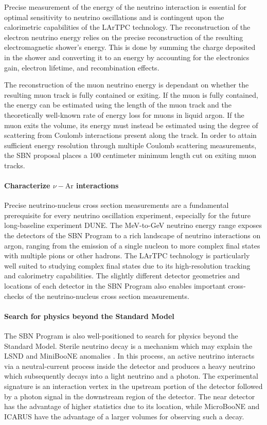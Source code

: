 Precise measurement of the energy of the neutrino interaction is essential for optimal sensitivity to neutrino oscillations and is contingent upon the calorimetric capabilities of the LArTPC technology. The reconstruction of the electron neutrino energy relies on the precise reconstruction of the resulting electromagnetic shower's energy. This is done by summing the charge deposited in the shower and converting it to an energy by accounting for the electronics gain, electron lifetime, and recombination effects. 

The reconstruction of the muon neutrino energy is dependant on whether the resulting muon track is fully contained or exiting. If the muon is fully contained, the energy can be estimated using the length of the muon track and the theoretically well-known rate of energy loss for muons in liquid argon. If the muon exits the volume, its energy must instead be estimated using the degree of scattering from Coulomb interactions present along the track. In order to attain sufficient energy resolution through multiple Coulomb scattering measurements, the SBN proposal places a 100 centimeter minimum length cut on exiting muon tracks.

\paragraph*{Characterize $\nu-\mathrm{Ar}$ interactions}
Precise neutrino-nucleus cross section measurements are a fundamental prerequisite for every neutrino oscillation experiment, especially for the future long-baseline experiment DUNE. The MeV-to-GeV neutrino energy range exposes the detectors of the SBN Program to a rich landscape of neutrino interactions on argon, ranging from the emission of a single nucleon to more complex final states with multiple pions or other hadrons. The LArTPC technology is particularly well suited to studying complex final states due to its high-resolution tracking and calorimetry capabilities. The slightly different detector geometries and locations of each detector in the SBN Program also enables important cross-checks of the neutrino-nucleus cross section measurements.

\paragraph*{Search for physics beyond the Standard Model}
The SBN Program is also well-positioned to search for physics beyond the Standard Model. Sterile neutrino decay is a mechanism which may explain the LSND and MiniBooNE anomalies \cite{Gninenko2009, Gninenko2012, Ballet2017}. In this process, an active neutrino interacts via a neutral-current process inside the detector and produces a heavy neutrino which subsequently decays into a light neutrino and a photon. The experimental signature is an interaction vertex in the upstream portion of the detector followed by a photon signal in the downstream region of the detector. The near detector has the advantage of higher statistics due to its location, while MicroBooNE and ICARUS have the advantage of a larger volumes for observing such a decay.

